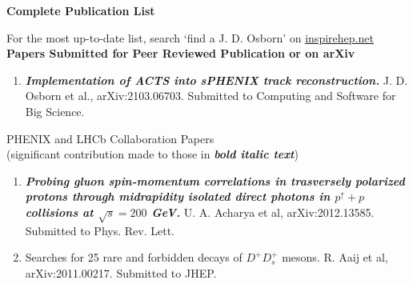 \documentclass[11pt]{article}
\begin{document}
%
%
%

\newpage




\cleardoublepage

\begin{flushleft}

\huge\textbf{Complete Publication List}
\vspace{0.5cm}

{\large For the most up-to-date list, search `find a J. D. Osborn' on \href{inspirehep.net}{inspirehep.net} \\}
\vspace{0.5cm}
\Large\textbf{Papers Submitted for Peer Reviewed Publication or on arXiv} \\
\normalsize
\begin{center}
	\begin{flushleft}
	
	\begin{enumerate}
		
		
		\item {\textbf{\textit{Implementation of ACTS into sPHENIX track reconstruction.}}} J. D. Osborn et al., arXiv:2103.06703. Submitted to Computing and Software for Big Science.
	\end{enumerate}
	
	\vspace{0.7cm}
	\large PHENIX and LHCb Collaboration Papers\\ (significant contribution made to those in \textbf{\textit{bold italic text}}) \\
	\end{flushleft}
	\begin{enumerate}

	\item \textbf{\textit{Probing gluon spin-momentum correlations in trasversely polarized protons through midrapidity isolated direct photons in $p^\uparrow+p$ collisions at $\sqrt{s}=200$ GeV.}} U. A. Acharya et al, arXiv:2012.13585. Submitted to Phys. Rev. Lett.
			

		\item Searches for 25 rare and forbidden decays of $D^+D_s^+ $ mesons. R. Aaij et al, arXiv:2011.00217. Submitted to JHEP.


\end{enumerate}
\end{center}
\end{flushleft}
\end{document}
